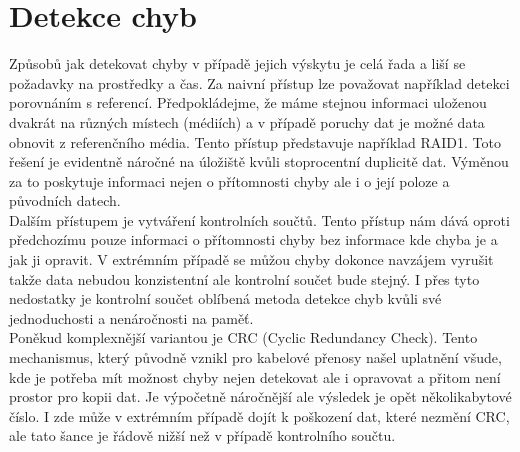 \section{Detekce chyb}
\label{sec:errordetection}
Způsobů jak detekovat chyby v případě jejich výskytu je celá řada a liší se požadavky na prostředky a čas. Za naivní přístup lze považovat například detekci porovnáním s referencí. Předpokládejme, že máme stejnou informaci uloženou dvakrát na různých místech (médiích) a v případě poruchy dat je možné data obnovit z referenčního média. Tento přístup představuje například RAID1. Toto řešení je evidentně náročné na úložiště kvůli stoprocentní duplicitě dat. Výměnou za to poskytuje informaci nejen o přítomnosti chyby ale i o její poloze a původních datech.\\ 
Dalším přístupem je vytváření kontrolních součtů. Tento přístup nám dává oproti předchozímu pouze informaci o přítomnosti chyby bez informace kde chyba je a jak ji opravit. V extrémním případě se můžou chyby dokonce navzájem vyrušit takže data nebudou konzistentní ale kontrolní součet bude stejný. I přes tyto nedostatky je kontrolní součet oblíbená metoda detekce chyb kvůli své jednoduchosti a nenáročnosti na paměť.\\
Poněkud komplexnější variantou je CRC (Cyclic Redundancy Check). Tento mechanismus, který původně vznikl pro kabelové přenosy našel uplatnění všude, kde je potřeba mít možnost chyby nejen detekovat ale i opravovat a přitom není prostor pro kopii dat. Je výpočetně náročnější ale výsledek je opět několikabytové číslo. I zde může v extrémním případě dojít k poškození dat, které nezmění CRC, ale tato šance je řádově nižší než v případě kontrolního součtu.

